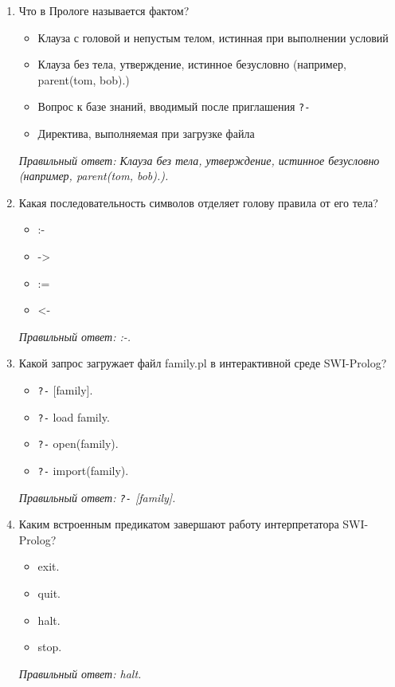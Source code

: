 \small
\begin{enumerate}[label=\textbf{\arabic*.}, leftmargin=0pt, itemsep=1.2em]
\item Что в Прологе называется фактом?
\begin{itemize}[label=$\square$, leftmargin=1.5cm, itemsep=0.2em, topsep=0.3em]
\item Клауза с головой и непустым телом, истинная при выполнении условий
\item Клауза без тела, утверждение, истинное безусловно (например, parent(tom, bob).)
\item Вопрос к базе знаний, вводимый после приглашения \texttt{?-}
\item Директива, выполняемая при загрузке файла
\end{itemize}
{\small\textit{Правильный ответ: Клауза без тела, утверждение, истинное безусловно (например, parent(tom, bob).).}}

\item Какая последовательность символов отделяет голову правила от его тела?
\begin{itemize}[label=$\square$, leftmargin=1.5cm, itemsep=0.2em, topsep=0.3em]
\item :-
\item ->
\item :=
\item <-
\end{itemize}
{\small\textit{Правильный ответ: :-.}}

\item Какой запрос загружает файл family.pl в интерактивной среде SWI-Prolog?
\begin{itemize}[label=$\square$, leftmargin=1.5cm, itemsep=0.2em, topsep=0.3em]
\item \texttt{?-} [family].
\item \texttt{?-} load family.
\item \texttt{?-} open(family).
\item \texttt{?-} import(family).
\end{itemize}
{\small\textit{Правильный ответ: \texttt{?-} [family].}}

\item Каким встроенным предикатом завершают работу интерпретатора SWI-Prolog?
\begin{itemize}[label=$\square$, leftmargin=1.5cm, itemsep=0.2em, topsep=0.3em]
\item exit.
\item quit.
\item halt.
\item stop.
\end{itemize}
{\small\textit{Правильный ответ: halt.}}


\end{enumerate}
